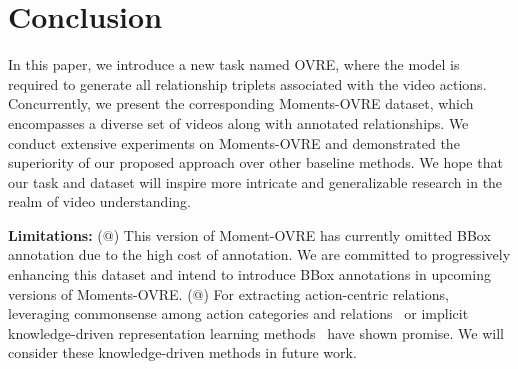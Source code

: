 \documentclass[letterpaper]{article}
\makeatletter
\newcommand{\Rmnum}[1]{\expandafter\@slowromancap\romannumeral #1@}
\newcommand{\wz}{\textcolor{blue}}
\makeatother
\begin{document}


\section{Conclusion}
In this paper, we introduce a new task named OVRE, where the model is required to generate all relationship triplets associated with the video actions. Concurrently, we present the corresponding Moments-OVRE dataset, which encompasses a diverse set of videos along with annotated relationships. We conduct extensive experiments on Moments-OVRE and demonstrated the superiority of our proposed approach over other baseline methods. We hope that our task and dataset will inspire more intricate and generalizable research in the realm of video understanding.

\hspace*{\fill}

\noindent \textbf{Limitations:}
(\Rmnum{1}) This version of Moment-OVRE has currently omitted BBox annotation due to the high cost of annotation. We are committed to progressively enhancing this dataset and intend to introduce BBox annotations in upcoming versions of Moments-OVRE.
(\Rmnum{2}) For extracting action-centric relations, leveraging commonsense among action categories and relations~\cite{yang2018commonsense} or implicit knowledge-driven representation learning methods~\cite{li2023knowledge, li2018deep} have shown promise. We will consider these knowledge-driven methods in future work.
\end{document}
